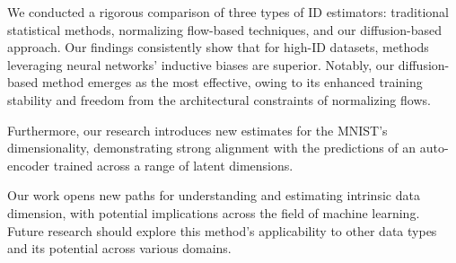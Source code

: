 We conducted a rigorous comparison of three types of ID estimators: traditional statistical methods, normalizing flow-based techniques, and our diffusion-based approach. Our findings consistently show that for high-ID datasets, methods leveraging neural networks' inductive biases are superior. Notably, our diffusion-based method emerges as the most effective, owing to its enhanced training stability and freedom from the architectural constraints of normalizing flows.

Furthermore, our research introduces new estimates for the MNIST's dimensionality, demonstrating strong alignment with the predictions of an auto-encoder trained across a range of latent dimensions.%

Our work opens new paths for understanding and estimating intrinsic data dimension, with potential implications across the field of machine learning. Future research should explore this method's applicability to other data types and its potential across various domains.
